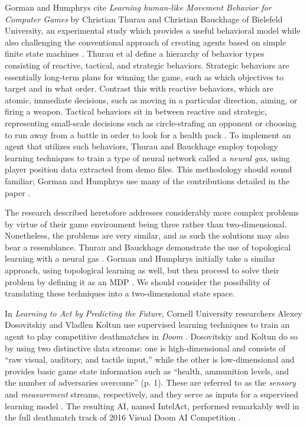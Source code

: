 Gorman and Humphrys cite {\it Learning human-like Movement Behavior for Computer Games} by Christian Thurau and Christian Bauckhage of Bielefeld University, an experimental study which provides a useful behavioral model while also challenging the conventional approach of creating agents based on simple finite state machines \cite{Thurau:2004}. Thurau et al define a hierarchy of behavior types consisting of reactive, tactical, and strategic behaviors. Strategic behaviors are essentially long-term plans for winning the game, such as which objectives to target and in what order. Contrast this with reactive behaviors, which are atomic, immediate decisions, such as moving in a particular direction, aiming, or firing a weapon. Tactical behaviors sit in between reactive and strategic, representing small-scale decisions such as circle-strafing an opponent or choosing to run away from a battle in order to look for a health pack \cite{Gorman:2006}. To implement an agent that utilizes such behaviors, Thurau and Bauckhage employ topology learning techniques to train a type of neural network called a {\it neural gas}, using player position data extracted from demo files. This methodology should sound familiar; Gorman and Humphrys use many of the contributions detailed in the paper \cite{Thurau:2004}.

The research described heretofore addresses considerably more complex problems by virtue of their game environment being three rather than two-dimensional. Nonetheless, the problems are very similar, and as such the solutions may also bear a resemblance. Thurau and Bauckhage demonstrate the use of topological learning with a neural gas \cite{Thurau:2004}. Gorman and Humphrys initially take a similar approach, using topological learning as well, but then proceed to solve their problem by defining it as an MDP \cite{Gorman:2006}. We should consider the possibility of translating these techniques into a two-dimensional state space.

In {\it Learning to Act by Predicting the Future}, Cornell University researchers Alexey Dosovitskiy and Vladlen Koltun use supervised learning techniques to train an agent to play competitive deathmatches in {\it Doom} \cite{:2016}. Dosovitskiy and Koltun do so by using two distinctive data streams: one is high-dimensional and consists of ``raw visual, auditory, and tactile input,'' while the other is low-dimensional and provides basic game state information such as ``health, ammunition levels, and the number of adversaries overcome'' (p. 1). These are referred to as the {\it sensory} and {\it measurement} streams, respectively, and they serve as inputs for a supervised learning model \cite{Dosovitskiy:2016}. The resulting AI, named IntelAct, performed remarkably well in the full deathmatch track of 2016 Visual Doom AI Competition \cite{VDComp:2016}.

